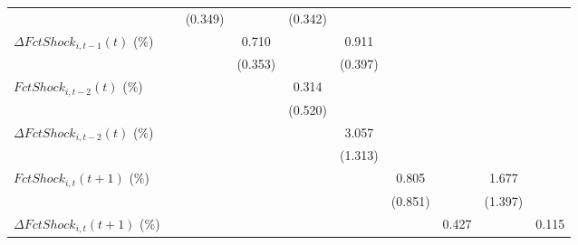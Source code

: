 {\begin{tabular}{l*{9}{c}}
                    &                     &     (0.349)         &                     &     (0.342)         &                     &                     &                     &                     &                     \\
\addlinespace
$ \Delta FctShock_{i,t-1}(t)$ (\%)&                     &                     &       0.710\sym{*}  &                     &       0.911\sym{**} &                     &                     &                     &                     \\
                    &                     &                     &     (0.353)         &                     &     (0.397)         &                     &                     &                     &                     \\
\addlinespace
$ FctShock_{i,t-2}(t)$ (\%)&                     &                     &                     &       0.314         &                     &                     &                     &                     &                     \\
                    &                     &                     &                     &     (0.520)         &                     &                     &                     &                     &                     \\
\addlinespace
$ \Delta FctShock_{i,t-2}(t)$ (\%)&                     &                     &                     &                     &       3.057\sym{**} &                     &                     &                     &                     \\
                    &                     &                     &                     &                     &     (1.313)         &                     &                     &                     &                     \\
\addlinespace
$ FctShock_{i,t}(t+1)$ (\%)&                     &                     &                     &                     &                     &       0.805         &                     &       1.677         &                     \\
                    &                     &                     &                     &                     &                     &     (0.851)         &                     &     (1.397)         &                     \\
\addlinespace
$ \Delta FctShock_{i,t}(t+1)$ (\%)&                     &                     &                     &                     &                     &                     &       0.427         &                     &       0.115         \\

\end{tabular}}
